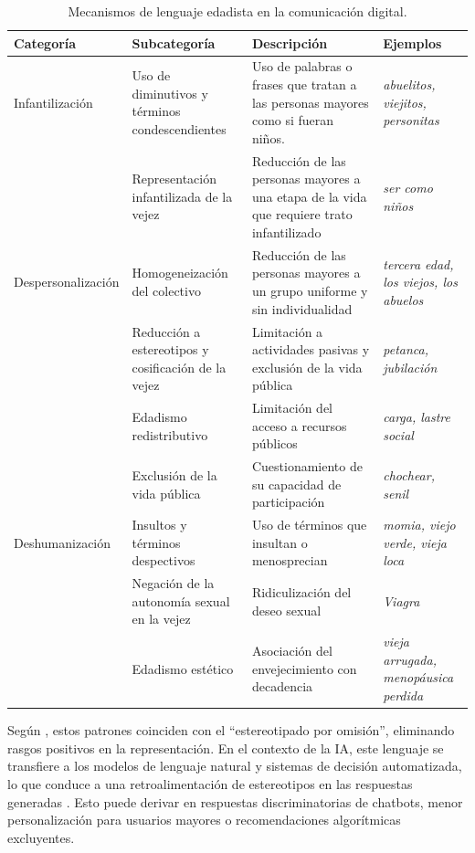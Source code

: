 \documentclass[spanish]{textolivre}
\begin{document}
\begin{table}[h!]
\centering
\begin{threeparttable}
\caption{Mecanismos de lenguaje edadista en la comunicación digital.}\label{tab-2}
\begin{tabular}{p{2.5cm}p{3cm}p{4.5cm}p{3cm}}
\toprule
Categoría & Subcategoría & Descripción & Ejemplos \\
\midrule
Infantilización & Uso de diminutivos y términos condescendientes & Uso de palabras o frases que tratan a las personas mayores como si fueran niños. & \textit{abuelitos, viejitos, personitas} \\
 & Representación infantilizada de la vejez & Reducción de las personas mayores a una etapa de la vida que requiere trato infantilizado & \textit{ser como niños} \\
\addlinespace
Despersonalización & Homogeneización del colectivo & Reducción de las personas mayores a un grupo uniforme y sin individualidad & \textit{tercera edad, los viejos, los abuelos} \\
 & Reducción a estereotipos y cosificación de la vejez & Limitación a actividades pasivas y exclusión de la vida pública & \textit{petanca, jubilación} \\
 & Edadismo redistributivo & Limitación del acceso a recursos públicos & \textit{carga, lastre social} \\
 & Exclusión de la vida pública & Cuestionamiento de su capacidad de participación & \textit{chochear, senil} \\
\addlinespace
Deshumanización & Insultos y términos despectivos & Uso de términos que insultan o menosprecian & \textit{momia, viejo verde, vieja loca} \\
 & Negación de la autonomía sexual en la vejez & Ridiculización del deseo sexual & \textit{Viagra} \\
 & Edadismo estético & Asociación del envejecimiento con decadencia & \textit{vieja arrugada, menopáusica perdida} \\
\bottomrule
\end{tabular}
\end{threeparttable}
\end{table}

Según \textcite{rosales2023}, estos patrones coinciden con el ``estereotipado por omisión'', eliminando rasgos positivos en la representación. En el contexto de la IA, este lenguaje se transfiere a los modelos de lenguaje natural y sistemas de decisión automatizada, lo que conduce a una retroalimentación de estereotipos en las respuestas generadas \cite{stypinska2023}. Esto puede derivar en respuestas discriminatorias de chatbots, menor personalización para usuarios mayores o recomendaciones algorítmicas excluyentes.
\end{document}
